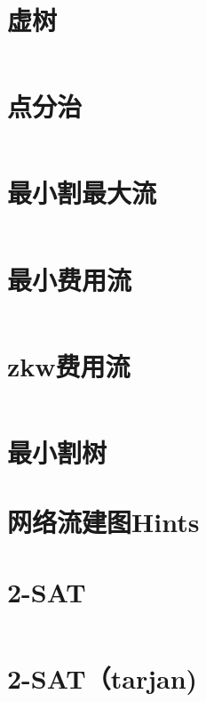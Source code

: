 \section{虚树}
\inputminted{cpp}{\source/graph-theory/mirage-tree.cpp}
\section{点分治}
\inputminted{cpp}{\source/graph-theory/vertex-partition.cpp}
\section{最小割最大流}
\inputminted{cpp}{\source/graph-theory/dinic.cpp}
\section{最小费用流}
\inputminted{cpp}{\source/graph-theory/mincost-maxflow.cpp}
\section{zkw费用流}
\inputminted{cpp}{\source/graph-theory/zkw-cost-flow.cpp}
\section{最小割树}
\section{网络流建图Hints}

\section{2-SAT}
\inputminted{cpp}{\source/graph-theory/sat-lexicographically.cpp}
\section{2-SAT（tarjan)}
\inputminted{cpp}{\source/graph-theory/2-sat-tarjan.cpp}
